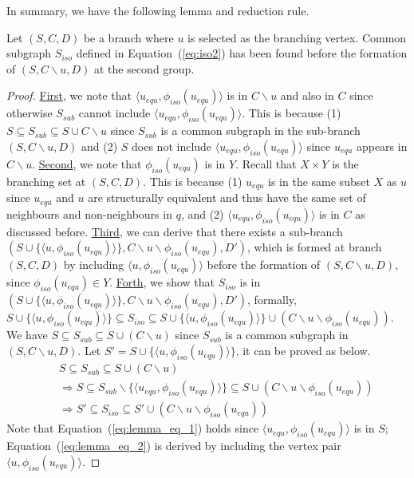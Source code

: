 In summary, we have the following lemma and reduction rule.

\begin{lemma}
\label{lemma:reduction_for_VE2}
Let $(S,C,D)$ be a branch where $u$ is selected as the branching vertex. Common subgraph $S_{iso}$ {\chengC defined in} Equation~(\ref{eq:iso2}) has been found before the formation of $(S,C\backslash u,D)$ at the second group.   
\end{lemma}
\begin{proof}
{\revision
    \underline{First}, we note that $\langle u_{equ},\phi_{iso}(u_{equ}) \rangle$ is in $C\backslash u$ and also in $C$ since otherwise $S_{sub}$ cannot include $\langle u_{equ},\phi_{iso}(u_{equ}) \rangle$. This is because (1) $S\subseteq S_{sub}\subseteq S\cup C\backslash u$ since $S_{sub}$ is a common subgraph in the sub-branch $(S,C\backslash u,D)$ and (2) $S$ does not include $\langle u_{equ},\phi_{iso}(u_{equ}) \rangle$ since $u_{equ}$ appears in $C\backslash u$.
    \underline{Second}, we note that $\phi_{iso}(u_{equ})$ is in $Y$. Recall that $X\times Y$ is the branching set at $(S,C,D)$. This is because (1) $u_{equ}$ is in the same subset $X$ as $u$ since $u_{equ}$ and $u$ are structurally equivalent and thus have the same set of neighbours and non-neighbours in $q$, and (2) $\langle u_{equ},\phi_{iso}(u_{equ}) \rangle$ is in $C$ as discussed before.
    \underline{Third}, we can derive that there exists a sub-branch $(S\cup \{\langle u,\phi_{iso}(u_{equ}) \rangle\},C\backslash u\backslash \phi_{iso}(u_{equ}),D')$, which is formed at branch $(S,C,D)$  by including $\langle u,\phi_{iso}(u_{equ}) \rangle$ before the formation of $(S,C\backslash u,D)$, since $\phi_{iso}(u_{equ})\in Y$.
    \underline{Forth}, we show that $S_{iso}$ is in $(S\cup \{\langle u,\phi_{iso}(u_{equ}) \rangle\},C\backslash u\backslash \phi_{iso}(u_{equ}),D')$, formally, $S\cup \{\langle u,\phi_{iso}(u_{equ}) \rangle\} \subseteq S_{iso}\subseteq S\cup \{\langle u,\phi_{iso}(u_{equ}) \rangle\}\cup (C\backslash u\backslash \phi_{iso}(u_{equ}))$.
    We have $S\subseteq S_{sub}\subseteq S\cup (C\backslash u)$ since $S_{sub}$ is a common subgraph in $(S,C\backslash u,D)$. Let $S'=S\cup \{\langle u,\phi_{iso}(u_{equ}) \rangle\}$, it can be proved as below.
    \begin{eqnarray}
        && S\subseteq S_{sub}\subseteq S\cup (C\backslash u)\\
        && \Rightarrow S\subseteq S_{sub}\backslash\{\langle u_{equ}, \phi_{iso}(u_{equ})\rangle\}\subseteq S\cup (C\backslash u\backslash \phi_{iso}(u_{equ})) \label{eq:lemma_eq_1}\\
        && \Rightarrow S' \subseteq S_{iso}\subseteq S'\cup (C\backslash u\backslash \phi_{iso}(u_{equ})) \label{eq:lemma_eq_2}
    \end{eqnarray}
    Note that Equation~(\ref{eq:lemma_eq_1}) holds since $\langle u_{equ},\phi_{iso}(u_{equ}) \rangle$ is in $S$; Equation~(\ref{eq:lemma_eq_2}) is derived by including the vertex pair $\langle u, \phi_{iso}(u_{equ})\rangle$.}
\end{proof}


